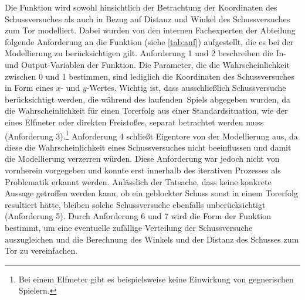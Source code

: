 Die Funktion wird sowohl hinsichtlich der Betrachtung der Koordinaten des Schussversuches als auch in Bezug auf Distanz und Winkel des Schussversuches zum Tor modelliert. Dabei wurden von den internen Fachexperten der Abteilung folgende Anforderung an die Funktion (siehe \vref{tab:anf}) aufgestellt, die es bei der Modellierung zu berücksichtigen gilt. Anforderung \textsf{1} und \textsf{2} beschreiben die In- und Output-Variablen der Funktion. Die Parameter, die die Wahrscheinlichkeit zwischen 0 und 1 bestimmen, sind lediglich die Koordinaten des Schussversuches in Form eines $x$- und $y$-Wertes. Wichtig ist, dass ausschließlich Schussversuche berücksichtigt werden, die während des \glqq laufenden\grqq~Spiels abgegeben wurden, da die Wahrscheinlichkeit für einen Torerfolg aus einer Standardsituation, wie der eines Elfmeter oder direkten Freistoßes, separat betrachtet werden muss (Anforderung \textsf{3}).\footnote{Bei einem Elfmeter gibt es beispielsweise keine Einwirkung von gegnerischen Spielern.} Anforderung \textsf{4} schließt Eigentore von der Modellierung aus, da diese die Wahrscheinlichkeit eines Schussversuches nicht beeinflussen und damit die Modellierung verzerren würden. Diese Anforderung war jedoch nicht von vornherein vorgegeben und konnte erst innerhalb des iterativen Prozesses als Problematik erkannt werden. Anlässlich der Tatsache, dass keine konkrete Aussage getroffen werden kann, ob ein geblockter Schuss sonst in einem Torerfolg resultiert hätte, bleiben solche Schussversuche ebenfalls unberücksichtigt (Anforderung \textsf{5}). Durch Anforderung \textsf{6} und \textsf{7} wird die Form der Funktion bestimmt, um eine eventuelle zufällige Verteilung der Schussversuche auszugleichen und die Berechnung des Winkels und der Distanz des Schusses zum Tor zu vereinfachen.

